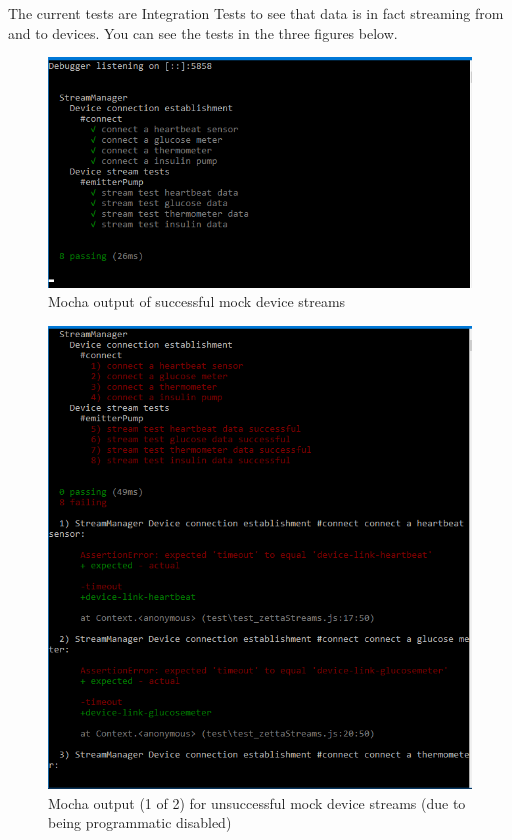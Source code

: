 \documentclass[12pt]{article}
\begin{document}
{	The current tests are Integration Tests to see that data is in fact streaming from and to devices. You can see the tests in the three figures below. 
	\begin{figure}[h!]
		\includegraphics[width=\textwidth]{tests/zettaStream/test-zetta-stream-pass}
		\caption{Mocha output of successful mock device streams}
	\end{figure}
	\begin{figure}[h!]
		\includegraphics[width=\textwidth]{tests/zettaStream/test-zetta-stream-fail00}
		\caption{Mocha output (1 of 2) for unsuccessful mock device streams (due to being programmatic disabled)}

\end{figure}}
\end{document}
